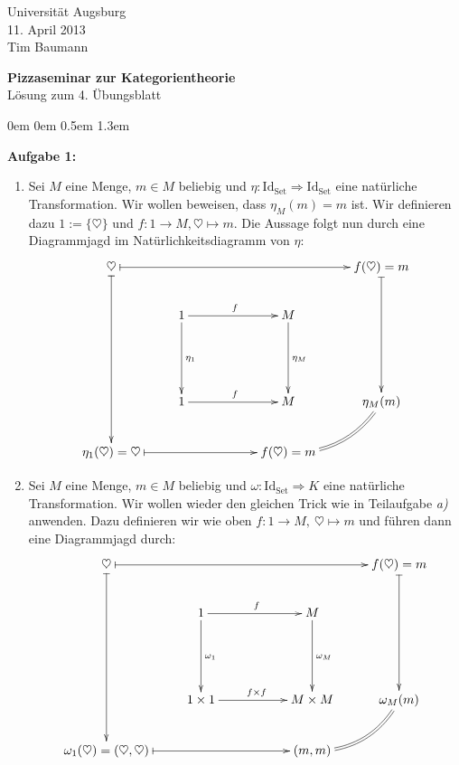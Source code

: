 \documentclass[a4paper,ngerman]{scrartcl}
\theoremstyle{definition}
\theoremstyle{plain}
\theoremstyle{remark}
\newcommand{\Set}{\mathrm{Set}}
\newcommand{\Id}{\mathrm{Id}}
\begin{document}
\vspace*{-4em}
\begin{flushright}Universität Augsburg \\ 11. April 2013 \\ Tim Baumann\end{flushright}

\begin{center}\Large \textbf{Pizzaseminar zur Kategorientheorie} \\
Lösung zum 4. Übungsblatt
\end{center}
\vspace{2em}


\begin{list}{}{0em \leftmargin0em \itemindent0.5em \itemsep 1.3em}
\item[\textbf{Aufgabe 1:}]\mbox{}

\begin{enumerate}
\item Sei $M$ eine Menge, $m \in M$ beliebig und $\eta:\Id_{\Set} \Rightarrow \Id_{\Set}$ eine natürliche Transformation. Wir wollen beweisen, dass $\eta_{M}(m) = m$ ist. Wir definieren dazu $1 := \{ \heartsuit \}$ und $f : 1 \to M, \heartsuit \mapsto m$. Die Aussage folgt nun durch eine Diagrammjagd im Natürlichkeitsdiagramm von $\eta$:
\[ \xymatrixcolsep{2pc}\xymatrix{
  \heartsuit \ar@{|->}[dddd] \ar@{|->}[rrrr] &&&& f(\heartsuit) = m \ar@{|->}[ddd] \\
  & 1 \ar[dd]^{\eta_{1}} \ar[rr]^{f} && M \ar[dd]^{\eta_{M}} \\
  \\
  & 1 \ar[rr]^{f} && M & \eta_{M}(m) \ar@{=}@/^1pc/[dl] \\
  \eta_{1}(\heartsuit) = \heartsuit \ar@{|->}[rrr] &&& f(\heartsuit) = m
} \]

\item Sei $M$ eine Menge, $m \in M$ beliebig und $\omega : \Id_{\Set} \Rightarrow K$ eine natürliche Transformation. Wir wollen wieder den gleichen Trick wie in Teilaufgabe \emph{a)} anwenden. Dazu definieren wir wie oben $f : 1 \to M,\ \heartsuit \mapsto m$ und führen dann eine Diagrammjagd durch:
\[ \xymatrixcolsep{2pc}\xymatrix{
  \heartsuit \ar@{|->}[dddd] \ar@{|->}[rrrr] &&&& f(\heartsuit) = m \ar@{|->}[ddd] \\
  & 1 \ar[dd]^{\omega_{1}} \ar[rr]^{f} && M \ar[dd]^{\omega_{M}} \\
  \\
  & 1 \times 1 \ar[rr]^{f \times f} && M \times M & \omega_{M}(m) \ar@{=}@/^1pc/[dl] \\
  \omega_{1}(\heartsuit) = (\heartsuit, \heartsuit) \ar@{|->}[rrr] &&& (m, m)
} \]


\end{enumerate}
\end{list}
\end{document}
